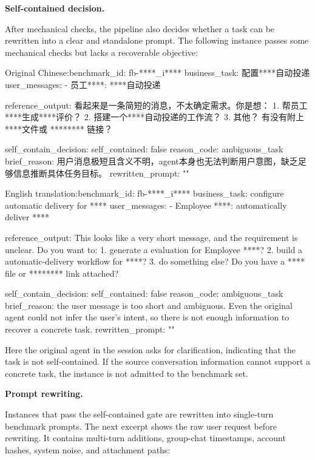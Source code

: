 \documentclass{llmxive}
\providecommand{\caseheader}[1]{\noindent\colorbox{fbcaseblue}{\parbox{0.96\linewidth}{\bfseries #1}}\vspace{0.5mm}\newline}
\begin{document}
\caseheader{Self-contained decision.}
After mechanical checks, the pipeline also decides whether a task can be rewritten into a clear and standalone prompt. The following instance passes some mechanical checks but lacks a recoverable objective:

\begin{casebox}\scriptsize
\begin{caselines}
Original Chinese:\nopagebreak[4]
benchmark\_id: fb-****\_i****
business\_task: 配置****自动投递
user\_messages:
- 员工****: ****自动投递

reference\_output:
看起来是一条简短的消息，不太确定需求。你是想：
1. 帮员工****生成****评价？
2. 搭建一个****自动投递的工作流？
3. 其他？
有没有附上****文件或 ******** 链接？

self\_contain\_decision:
  self\_contained: false
  reason\_code: ambiguous\_task
  brief\_reason: 用户消息极短且含义不明，agent本身也无法判断用户意图，缺乏足够信息推断具体任务目标。
  rewritten\_prompt: ""

English translation:\nopagebreak[4]
benchmark\_id: fb-****\_i****
business\_task: configure automatic delivery for ****
user\_messages:
- Employee ****: automatically deliver ****

reference\_output:
This looks like a very short message, and the requirement is unclear. Do you want to:
1. generate a evaluation for Employee ****?
2. build a automatic-delivery workflow for ****?
3. do something else?
Do you have a **** file or ******** link attached?

self\_contain\_decision:
  self\_contained: false
  reason\_code: ambiguous\_task
  brief\_reason: the user message is too short and ambiguous. Even the original agent could not infer the user's intent, so there is not enough information to recover a concrete task.
  rewritten\_prompt: ""
\end{caselines}
\end{casebox}

Here the original agent in the session asks for clarification, indicating that the task is not self-contained. If the source conversation information cannot support a concrete task, the instance is not admitted to the benchmark set.

\caseheader{Prompt rewriting.}
Instances that pass the self-contained gate are rewritten into single-turn benchmark prompts. The next excerpt shows the raw user request before rewriting. It contains multi-turn additions, group-chat timestamps, account hashes, system noise, and attachment paths:
\end{document}

